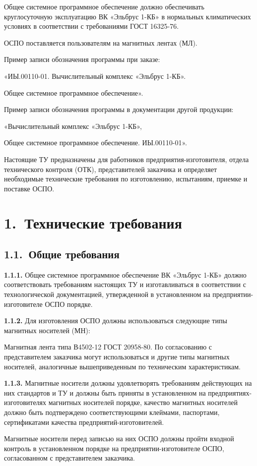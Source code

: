 \documentclass[11pt,a4paper]{article}
\begin{document}
Общее системное программное обеспечение должно обеспечивать круглосуточную эксплуатацию ВК «Эльбрус 1-КБ» в нормальных климатических условиях в соответствии с требованиями ГОСТ 16325-76.

ОСПО поставляется пользователям на магнитных лентах (МЛ).

Пример записи обозначения программы при заказе:

«ИЫ.00110-01. Вычислительный комплекс «Эльбрус 1-КБ».

Общее системное программное обеспечение».

Пример записи обозначения программы в документации другой продукции:

«Вычислительный комплекс «Эльбрус 1-КБ»,

Общее системное программное обеспечение. ИЫ.00110-01».

Настоящие ТУ предназначены для работников предприятия-изготовителя, отдела технического контроля (ОТК), представителей заказчика и определяет необходимые технические требования по изготовлению, испытаниям, приемке и поставке ОСПО.

\tableofcontents\clearpage
\section*{1.~Технические требования}
\subsection*{1.1.~Общие требования}
\par\textbf{1.1.1.} Общее системное программное обеспечение ВК «Эльбрус 1-КБ» должно соответствовать требованиям настоящих ТУ и изготавливаться в соответствии с технологической документацией, утвержденной в установленном на предприятии-изготовителе ОСПО порядке.\par
\par\textbf{1.1.2.} Для изготовления ОСПО должны использоваться следующие типы магнитных носителей (МН):\par
Магнитная лента типа В4502-12 ГОСТ 20958-80. По согласованию с представителем заказчика могут использоваться и другие типы магнитных носителей, аналогичные вышеприведенным по техническим характеристикам.

\par\textbf{1.1.3.} Магнитные носители должны удовлетворять требованиям действующих на них стандартов и ТУ и должны быть приняты в установленном на предприятиях-изготовителях магнитных носителей порядке, качество магнитных носителей должно быть подтверждено соответствующими клеймами, паспортами, сертификатами качества предприятий-изготовителей.\par
Магнитные носители перед записью на них ОСПО должны пройти входной контроль в установленном порядке на предприятии-изготовителе ОСПО, согласованном с представителем заказчика.
\end{document}
